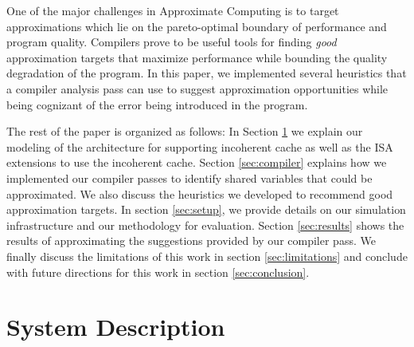 \documentclass[12pt,conference]{IEEEtran}
\begin{document}
One of the major challenges in Approximate Computing is 
to target approximations which lie on the pareto-optimal
boundary of performance and program quality. Compilers prove
to be useful tools for finding \emph{good} approximation 
targets that maximize performance while bounding the
quality degradation of the program. In this paper, we implemented several 
heuristics that a compiler analysis pass can use to suggest approximation
opportunities while being cognizant of the error being introduced in the
program. 

The rest of the paper is organized as follows: In Section \ref{sec:system} we explain our 
modeling of the architecture for supporting incoherent cache as well as the
ISA extensions to use the incoherent cache. Section \ref{sec:compiler} explains how we implemented
our compiler passes to identify shared variables that could be 
approximated. We also discuss the heuristics we developed to recommend good 
approximation targets. In section \ref{sec:setup}, we provide details on our 
simulation infrastructure and our methodology for evaluation. Section \ref{sec:results}
shows the results of approximating the suggestions provided by our compiler pass.
We finally discuss the limitations of this work in section \ref{sec:limitations}
and conclude with future directions for this work in section \ref{sec:conclusion}.

\section{System Description} \label{sec:system} \label{sec:mech}
\end{document}
